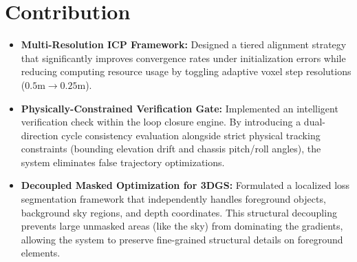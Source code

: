 \documentclass{article}
\begin{document}
\section{Contribution}
\begin{itemize}
    \item \textbf{Multi-Resolution ICP Framework:} Designed a tiered alignment strategy that significantly improves convergence rates under initialization errors while reducing computing resource usage by toggling adaptive voxel step resolutions ($0.5\text{m} \rightarrow 0.25\text{m}$).
    \item \textbf{Physically-Constrained Verification Gate:} Implemented an intelligent verification check within the loop closure engine. By introducing a dual-direction cycle consistency evaluation alongside strict physical tracking constraints (bounding elevation drift and chassis pitch/roll angles), the system eliminates false trajectory optimizations.
    \item \textbf{Decoupled Masked Optimization for 3DGS:} Formulated a localized loss segmentation framework that independently handles foreground objects, background sky regions, and depth coordinates. This structural decoupling prevents large unmasked areas (like the sky) from dominating the gradients, allowing the system to preserve fine-grained structural details on foreground elements.
\end{itemize}
\end{document}
